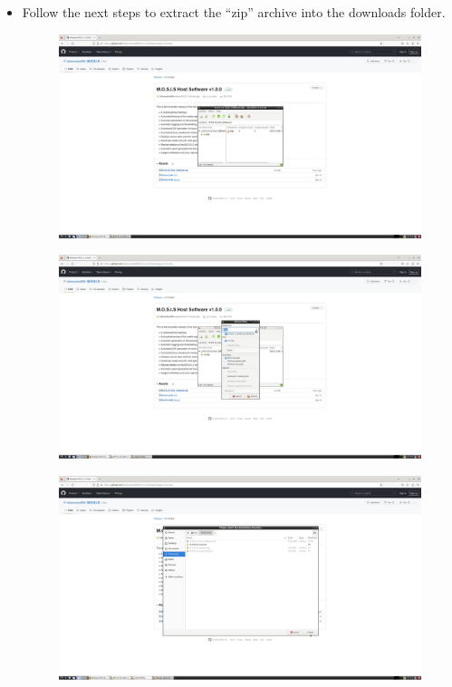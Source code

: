 \documentclass[12pt]{article}
\begin{document}
\begin{center}
\begin{itemize}
\begin{figure}[H]
		      \end{figure}
		\item Follow the next steps to extract the ``zip'' archive into the downloads folder.
		      \begin{figure}[H]
			      \includegraphics[width=\textwidth]{Figures/Linix-Extract-Archive.png}
		      \end{figure}
		      \begin{figure}[H]
			      \includegraphics[width=\textwidth]{Figures/Linix-Extract-Archive-2.png}
		      \end{figure}
		      \begin{figure}[H]
			      \includegraphics[width=\textwidth]{Figures/Linix-Extract-Archive-3.png}

\end{figure}
\end{itemize}
\end{center}
\end{document}
